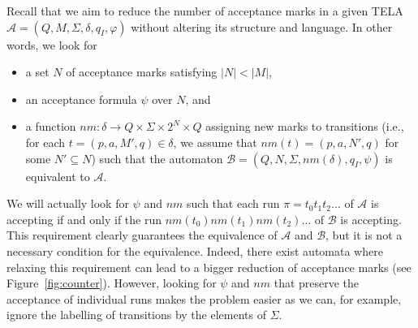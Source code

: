 \documentclass[a4paper,UKenglish,cleveref,autoref,thm-restate]{lipics-v2021}
\newcommand{\oM}{N}
\newcommand{\rem}{\mathit{nm}}
\newcommand{\mA}{\mathcal{A}}
\newcommand{\mB}{\mathcal{B}}
\begin{document}
Recall that we aim to reduce the number of acceptance marks in a given
TELA $\mA =(Q,M,\Sigma,\delta,q_I,\varphi)$ without altering its
structure and language. In other words, we look for
\begin{itemize}
\item a set $\oM$ of acceptance marks satisfying $|\oM|<|M|$,
\item an acceptance formula $\psi$ over $\oM$, and 
\item a function
  $\rem:\delta\rightarrow Q \times \Sigma \times 2^{\oM}\times Q$
  assigning new marks to transitions (i.e., for each
  $t=(p,a,M',q)\in\delta$, we assume that $\rem(t)=(p,a,\oM',q)$ for
  some $\oM'\subseteq\oM$)
  such that the automaton $\mB=(Q,\oM,\Sigma,\rem(\delta),q_I,\psi)$
  is equivalent to $\mA$.
\end{itemize}
We will actually look for $\psi$ and $\rem$ such that each run
$\pi=t_0t_1t_2\ldots$ of $\mA$ is accepting if and only if the run
$\rem(t_0)\rem(t_1)\rem(t_2)\ldots$ of $\mB$ is accepting. This
requirement clearly guarantees the equivalence of $\mA$ and $\mB$,
but it is not a necessary condition for the equivalence. Indeed, there
exist automata where relaxing this requirement can lead to a bigger
reduction of acceptance marks (see Figure~\ref{fig:counter}). However,
looking for $\psi$ and $\rem$ that preserve the acceptance of individual
runs makes the problem easier as we can, for example, ignore the
labelling of transitions by the elements of $\Sigma$.
\end{document}
